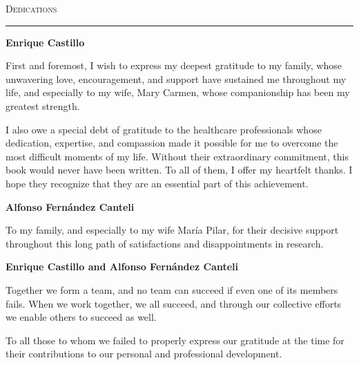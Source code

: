 



\vspace*{1.8cm}

\begin{center}
{\Huge\scshape Dedications}

\vspace{0.8cm}
\rule{0.32\textwidth}{0.5pt}
\end{center}

\vspace{1.2cm}

\noindent
{\Large\bfseries Enrique Castillo}

\vspace{0.5cm}

First and foremost, I wish to express my deepest gratitude to my family, whose unwavering love, encouragement, and support have sustained me throughout my life, and especially to my wife, Mary Carmen, whose companionship has been my greatest strength.

I also owe a special debt of gratitude to the healthcare professionals whose dedication, expertise, and compassion made it possible for me to overcome the most difficult moments of my life. Without their extraordinary commitment, this book would never have been written. To all of them, I offer my heartfelt thanks. I hope they recognize that they are an essential part of this achievement.



\vspace{1.3cm}

\noindent
{\Large\bfseries Alfonso Fernández Canteli}

\vspace{0.5cm}

To my family, and especially to my wife María Pilar, for their decisive support throughout this long path of satisfactions and disappointments in research.

\vspace{1.3cm}

\noindent
{\Large\bfseries Enrique Castillo and Alfonso Fernández Canteli}

\vspace{0.5cm}

Together we form a team, and no team can succeed if even one of its members
fails. When we work together, we all succeed, and through our collective efforts we enable others to succeed as well.

To all those to whom we failed to properly express our gratitude at the time for their contributions to our personal and professional development.
